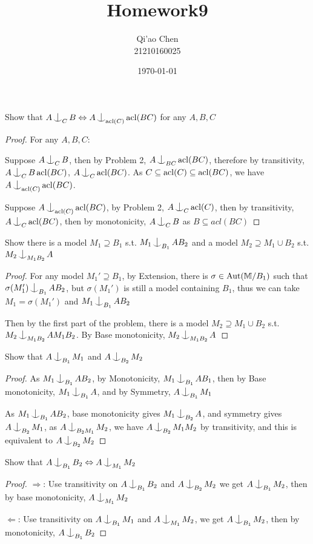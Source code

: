 \documentclass[11pt]{article}
\author{Qi'ao Chen\\21210160025}
\date{\today}
\title{Homework9}
\begin{document}
\maketitle
\begin{exercise}
Show that \(A\ind_CB\Leftrightarrow A\ind_{\acl(C)}\acl(BC)\) for any \(A,B,C\)
\end{exercise}

\begin{proof}
For any \(A,B,C\):

Suppose \(A\ind_CB\), then by Problem 2, \(A\ind_{BC}\acl(BC)\), therefore by
transitivity, \(A\ind_CB\acl(BC)\), \(A\ind_C\acl(BC)\). As \(C\subseteq\operatorname{acl}(C)\subseteq\operatorname{acl}(BC)\), we have
\(A\ind_{\acl(C)}\acl(BC)\).

Suppose \(A\ind_{\acl(C)}\acl(BC)\), by Problem 2, \(A\ind_C\acl(C)\), then by
transitivity, \(A\ind_C\acl(BC)\), then by monotonicity, \(A\ind_CB\) as \(B\subseteq acl(BC)\)
\end{proof}

\begin{exercise}
Show there is a model \(M_1\supseteq B_1\) s.t. \(M_1\ind_{B_1}AB_2\) and a model \(M_2\supseteq M_1\cup B_2\) s.t. \(M_2\ind_{M_1B_2}A\)
\end{exercise}

\begin{proof}
For any model \(M_1'\supseteq B_1\), by Extension, there is \(\sigma\in\operatorname{\text{Aut}}(\mathbb{M}/B_1)\) such that \(\sigma(M_1')\ind_{B_1}AB_2\),
but \(\sigma(M_1')\) is still a model containing \(B_1\), thus we can take \(M_1=\sigma(M_1')\)
and \(M_1\ind_{B_1}AB_2\)

Then by the first part of the problem, there is a model \(M_2\supseteq M_1\cup B_2\) s.t. \(M_2\ind_{M_1B_2}AM_1B_2\).
By Base monotonicity, \(M_2\ind_{M_1B_2}A\)
\end{proof}

\begin{exercise}
Show that \(A\ind_{B_1}M_1\) and \(A\ind_{B_2}M_2\)
\end{exercise}

\begin{proof}
As \(M_1\ind_{B_1}AB_2\), by Monotonicity, \(M_1\ind_{B_1}AB_1\), then by Base
monotonicity, \(M_1\ind_{B_1}A\), and by Symmetry, \(A\ind_{B_1}M_1\)

As \(M_1\ind_{B_1}AB_2\), base monotonicity gives \(M_1\ind_{B_2}A\), and symmetry
gives \(A\ind_{B_2}M_1\), as \(A\ind_{B_2M_1}M_2\), we have \(A\ind_{B_2}M_1M_2\) by transitivity, and this
is equivalent to \(A\ind_{B_2}M_2\)
\end{proof}

\begin{exercise}
Show that \(A\ind_{B_1}B_2\Leftrightarrow A\ind_{M_1}M_2\)
\end{exercise}

\begin{proof}
\(\Rightarrow\): Use transitivity on \(A\ind_{B_1}B_2\) and \(A\ind_{B_2}M_2\) we get \(A\ind_{B_1}M_2\), then by base
monotonicity, \(A\ind_{M_1}M_2\)

\(\Leftarrow\): Use transitivity on \(A\ind_{B_1}M_1\) and \(A\ind_{M_1}M_2\), we get \(A\ind_{B_1}M_2\), then by
monotonicity, \(A\ind_{B_1}B_2\)
\end{proof}
\end{document}

